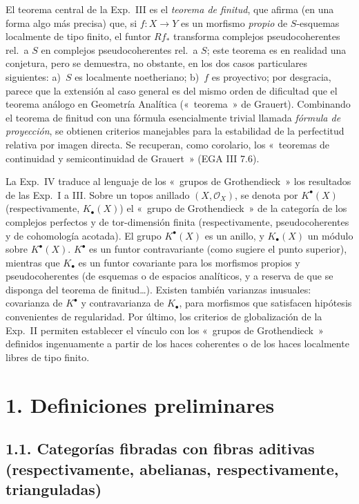 El teorema central de la Exp.\ III es el \emph{teorema de finitud}, que afirma (en una forma algo más precisa) que, si \(f:X\to Y\) es un morfismo \emph{propio} de \(S\)-esquemas localmente de tipo finito, el funtor \(Rf_*\) transforma complejos pseudocoherentes rel.\ a \(S\) en complejos pseudocoherentes rel.\ a \(S\); este teorema es en realidad una conjetura, pero se demuestra, no obstante, en los dos casos particulares siguientes: a)~\(S\) es localmente noetheriano; b)~\(f\) es proyectivo; por desgracia, parece que la extensión al caso general es del mismo orden de dificultad que el teorema análogo en Geometría Analítica («~teorema~» de Grauert). Combinando el teorema de finitud con una fórmula esencialmente trivial llamada \emph{fórmula de proyección}, se obtienen criterios manejables para la estabilidad de la perfectitud relativa por imagen directa. Se recuperan, como corolario, los «~teoremas de continuidad y semicontinuidad de Grauert~» (EGA III 7.6).

La Exp.\ IV traduce al lenguaje de los «~grupos de Grothendieck~» los resultados de las Exp.\ I a III. Sobre un topos anillado \((X,\mathcal O_X)\), se denota por \(K^\bullet(X)\) (respectivamente, \(K_\bullet(X)\)) el «~grupo de Grothendieck~» de la categoría de los complejos perfectos y de tor-dimensión finita (respectivamente, pseudocoherentes y de cohomología acotada). El grupo \(K^\bullet(X)\) es un anillo, y \(K_\bullet(X)\) un módulo sobre \(K^\bullet(X)\). \(K^\bullet\) es un funtor contravariante (como sugiere el punto superior), mientras que \(K_\bullet\) es un funtor covariante para los morfismos propios y pseudocoherentes (de esquemas o de espacios analíticos, y a reserva de que se disponga del teorema de finitud\dots). Existen también varianzas inusuales: covarianza de \(K^\bullet\) y contravarianza de \(K_\bullet\), para morfismos que satisfacen hipótesis convenientes de regularidad. Por último, los criterios de globalización de la Exp.\ II permiten establecer el vínculo con los «~grupos de Grothendieck~» definidos ingenuamente a partir de los haces coherentes o de los haces localmente libres de tipo finito.

\section*{1. Definiciones preliminares}

\subsection*{1.1. Categorías fibradas con fibras aditivas (respectivamente, abelianas, respectivamente, trianguladas)}

